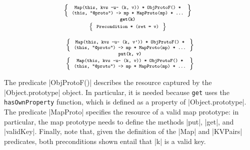 \noindent
\begin{minipage}{0.475\textwidth}
\begin{displaymath} 
{\scriptsize
\hspace*{-0.2cm}
\begin{array}{c}
\left\{ {\begin{array}{c}
 \text{\texttt{Map(this, kvs -u- (k, v)) * ObjProtoF() *}} \\
 \text{\texttt{(this, "@proto") -> mp * MapProto(mp) * ...}}
\end{array}} \right\} \\
%
\text{\bfseries \texttt{get(k)}} \\[0.2mm]
%
\left\{ {\begin{array}{c}
 \text{\texttt{Precondition * (ret = v)}} 
\end{array}} \right\}
\end{array}
} 
\end{displaymath}
\end{minipage}
\quad
\begin{minipage}{0.48\textwidth}
%
\begin{displaymath} 
{\scriptsize
\begin{array}{c}
\left\{ {\begin{array}{c}
 \text{\texttt{Map(this, kvs -u- (k, v')) * ObjProtoF() *}} \\
 \text{\texttt{(this, "@proto") -> mp * MapProto(mp) * ...}}
\end{array}} \right\} \\
%
\text{\bfseries \texttt{put(k, v)}} \\[0.2mm]
%
\left\{ {\begin{array}{c}
 \text{\texttt{Map(this, kvs -u- (k, v)) * ObjProtoF() *}} \\
 \text{\texttt{(this, "@proto") -> mp * MapProto(mp) * ...}}
\end{array}} \right\}
\end{array}
} 
\end{displaymath}
\end{minipage}

\vspace{10pt}
The predicate \jsinline|ObjProtoF()| describes the resource captured by the \jsinline|Object.prototype| object. 
In particular, it is needed because \texttt{get} uses the \texttt{hasOwnProperty} function, which is defined as a property of \jsinline|Object.prototype|. 
The predicate \jsinline|MapProto| specifies the resource of a valid map prototype: in particular, the map prototype needs to define the methods \jsinline|put|, \jsinline|get|, and \jsinline|validKey|. Finally, note that, given the definition of the \jsinline|Map| and \jsinline|KVPairs| predicates, both preconditions shown entail that \jsinline|k| is a valid key.

